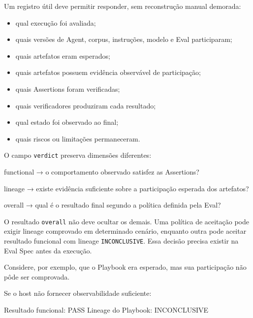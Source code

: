 \documentclass[
  10pt,
  a4paper,
  oneside]{book}
\newenvironment{Shaded}{}{}
\newcommand{\NormalTok}[1]{#1}
\providecommand{\tightlist}{%
  \setlength{\itemsep}{0pt}\setlength{\parskip}{0pt}}
\renewenvironment{Shaded}{\begin{snugshade}}{\end{snugshade}}%
\begin{document}
Um registro útil deve permitir responder, sem reconstrução manual
demorada:

\begin{itemize}
\tightlist
\item
  qual execução foi avaliada;
\item
  quais versões de Agent, corpus, instruções, modelo e Eval
  participaram;
\item
  quais artefatos eram esperados;
\item
  quais artefatos possuem evidência observável de participação;
\item
  quais Assertions foram verificadas;
\item
  quais verificadores produziram cada resultado;
\item
  qual estado foi observado ao final;
\item
  quais riscos ou limitações permaneceram.
\end{itemize}

O campo \texttt{verdict} preserva dimensões diferentes:

\begin{Shaded}
\begin{Highlighting}[]
\NormalTok{functional}
\NormalTok{→ o comportamento observado satisfez as Assertions?}

\NormalTok{lineage}
\NormalTok{→ existe evidência suficiente sobre a participação esperada dos artefatos?}

\NormalTok{overall}
\NormalTok{→ qual é o resultado final segundo a política definida pela Eval?}
\end{Highlighting}
\end{Shaded}

O resultado \texttt{overall} não deve ocultar os demais. Uma política de
aceitação pode exigir lineage comprovado em determinado cenário,
enquanto outra pode aceitar resultado funcional com lineage
\texttt{INCONCLUSIVE}. Essa decisão precisa existir na Eval Spec antes
da execução.

Considere, por exemplo, que o Playbook era esperado, mas sua
participação não pôde ser comprovada.

Se o host não fornecer observabilidade suficiente:

\begin{Shaded}
\begin{Highlighting}[]
\NormalTok{Resultado funcional: PASS}
\NormalTok{Lineage do Playbook: INCONCLUSIVE}
\end{Highlighting}
\end{Shaded}
\end{document}
